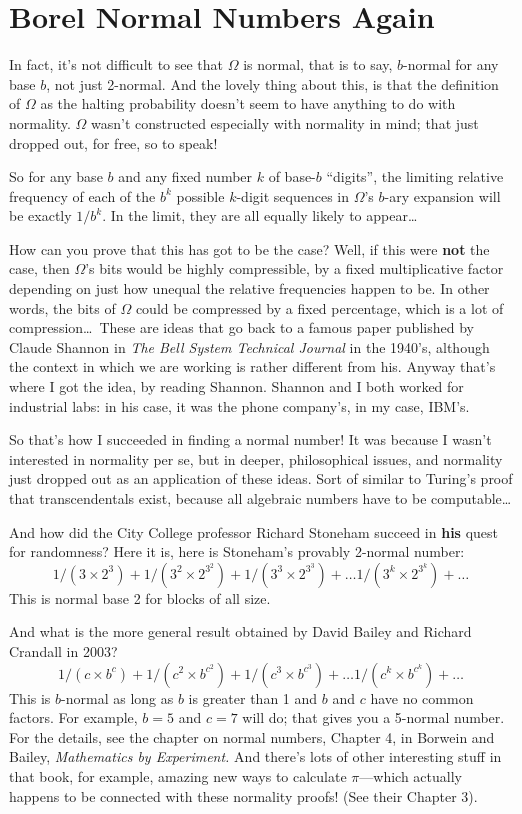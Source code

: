 \documentclass[12pt]{book}
\begin{document}
\section*{Borel Normal Numbers Again}

In fact, it's not difficult to see that $\Omega$ is normal, that is to say, $b$-normal
for any base $b$, not just 2-normal.  And the lovely thing about this, is that the
definition of $\Omega$ as the halting probability doesn't seem to have anything to do
with normality.  $\Omega$ wasn't constructed especially with normality in mind; that just dropped out,
for free, so to speak!
 
So for any base $b$ and any fixed number $k$ of base-$b$ ``digits'', the limiting relative
frequency of each of the $b^k$ possible $k$-digit sequences in $\Omega$'s $b$-ary
expansion will be exactly $1/b^k$.  In the limit, they are all equally likely
to appear\ldots
 
How can you prove that this has got to be the case? Well, if this were \textbf{not} the
case, then $\Omega$'s bits would be highly compressible, by a fixed multiplicative factor
depending on just how unequal the relative frequencies happen to be.  In other words, the bits of
$\Omega$ could be compressed by a fixed percentage, which is a lot of compression\ldots\
These are ideas that go back to a famous paper published by Claude Shannon in 
\emph{The Bell System Technical Journal} in
the 1940's, although
the context in which we are working is rather different from his.
Anyway that's where I got the idea, by reading Shannon.
Shannon and I both worked for industrial labs: in his case, it was the phone
company's, in my case, IBM's.
 
So that's how I succeeded in finding a normal number!  It was because I wasn't interested
in normality per se, but in deeper, philosophical issues, and normality just dropped out
as an application of these ideas.
Sort of similar to Turing's proof that transcendentals exist, because all algebraic numbers
have to be computable\ldots
 
And how did the City College professor Richard Stoneham succeed in \textbf{his} quest for
randomness?  Here it is, here is Stoneham's provably 2-normal number:
\[
   1/(3 \times 2^3) + 1/(3^2 \times 2^{3^2})
                    + 1/(3^3 \times 2^{3^3})
             + \ldots 1/(3^k \times 2^{3^k}) + \ldots
\]
This is normal base 2 for blocks of all size.
 
And what is the more general result obtained by
David Bailey and Richard Crandall in 2003? 
\[
   1/(c \times b^c) + 1/(c^2 \times b^{c^2})
                    + 1/(c^3 \times b^{c^3})
             + \ldots 1/(c^k \times b^{c^k}) + \ldots
\]
This is $b$-normal as long as $b$ is greater than 1 and $b$ and $c$ have no common factors.
For example, $b = 5$ and $c = 7$ will do; that gives you a 5-normal number.
For the details, see the chapter on normal numbers, Chapter 4, in Borwein and Bailey,
\emph{Mathematics by Experiment.}
And there's lots of other interesting stuff in that book, for example, amazing new ways to
calculate $\pi$---which actually happens to be connected with these normality proofs!
(See their Chapter 3).
\end{document}
